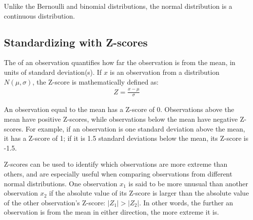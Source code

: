 Unlike the Bernoulli and binomial distributions, the normal distribution is a continuous distribution. 

\subsection{Standardizing with Z-scores}

The  of an observation quantifies how far the observation is from the mean, in units of standard deviation(s). If $x$ is an observation from a distribution $N(\mu, \sigma)$, the Z-score is mathematically defined as:
\begin{align*}
	Z = \frac{x-\mu}{\sigma}
\end{align*}

An observation equal to the mean has a Z-score of 0. Observations above the mean have positive Z-scores, while observations below the mean have negative Z-scores. For example, if an observation is one standard deviation above the mean, it has a Z-score of 1; if it is 1.5 standard deviations below the mean, its Z-score is -1.5. 

Z-scores can be used to identify which observations are more extreme than others, and are especially useful when comparing observations from different normal distributions. One observation $x_1$ is said to be more unusual than another observation $x_2$ if the absolute value of its Z-score is larger than the absolute value of the other observation's Z-score: $|Z_1| > |Z_2|$. In other words, the further an observation is from the mean in either direction, the more extreme it is. 

